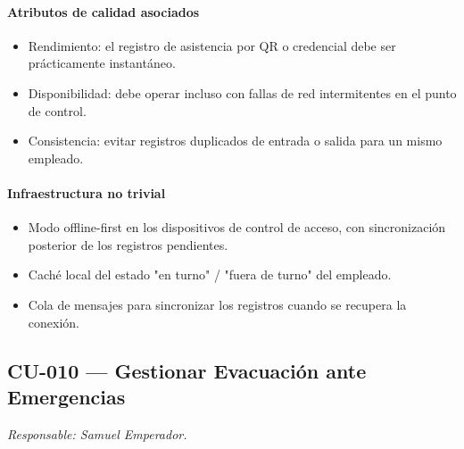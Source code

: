 \paragraph{Atributos de calidad asociados}
\begin{itemize}[leftmargin=1.4em, topsep=1pt]
  \item Rendimiento: el registro de asistencia por QR o credencial debe ser prácticamente instantáneo.
  \item Disponibilidad: debe operar incluso con fallas de red intermitentes en el punto de control.
  \item Consistencia: evitar registros duplicados de entrada o salida para un mismo empleado.
\end{itemize}

\paragraph{Infraestructura no trivial}
\begin{itemize}[leftmargin=1.4em, topsep=1pt]
  \item Modo offline-first en los dispositivos de control de acceso, con sincronización posterior de los registros pendientes.
  \item Caché local del estado "en turno" / "fuera de turno" del empleado.
  \item Cola de mensajes para sincronizar los registros cuando se recupera la conexión.
\end{itemize}

\subsection{CU-010 --- Gestionar Evacuación ante Emergencias}
\label{cu:cu-010}
\textit{Responsable: Samuel Emperador.}

